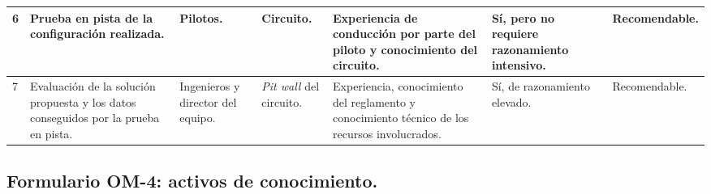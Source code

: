 \documentclass[12pt,a4paper,twoside,spanish]{article}      %
\newcommand{\PreserveBackslash}[1]{\let\temp=\\#1\let\\=\temp}
\let\PBS=\PreserveBackslash
\begin{document}
\begin{table}[H]
\begin{tabularx}{\textwidth}{|p{0.2cm}|>{\raggedright}X|>{\raggedright}X|>{\raggedright}X|>{\raggedright}X|>{\raggedright}X|>{\PBS\raggedright}X|}
6 &
Prueba en pista de la configuración realizada. & 
Pilotos. &
Circuito. & 
Experiencia de conducción por parte del piloto y conocimiento del circuito. &
Sí, pero no requiere razonamiento intensivo. & 
Recomendable. \\ \hline

7 &
Evaluación de la solución propuesta y los datos conseguidos por la prueba en pista. & 
Ingenieros y director del equipo. &
\textit{Pit wall} del circuito. & 
Experiencia, conocimiento del reglamento y conocimiento técnico de los recursos involucrados. &
Sí, de razonamiento elevado. & 
Recomendable. \\ \hline

\end{tabularx}
\label{tab.OM3}
\end{table}



\pagebreak
\subsection{Formulario OM-4: activos de conocimiento.}
\end{document}
